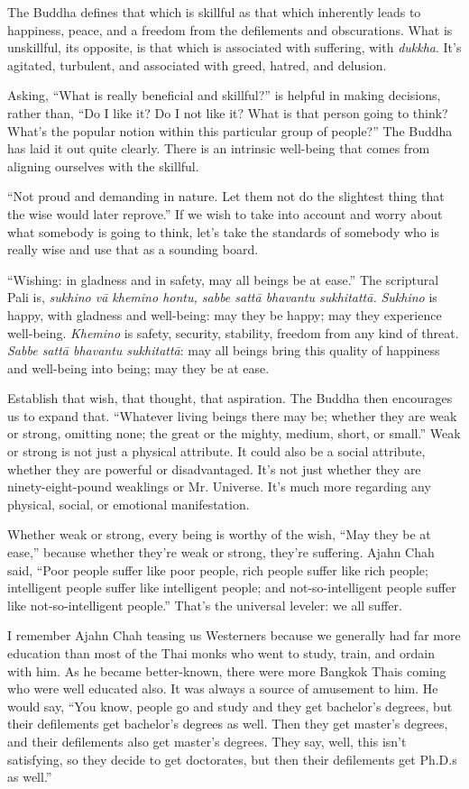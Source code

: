 The Buddha defines that which is skillful as that which inherently leads
to happiness, peace, and a freedom from the defilements and
obscurations. What is unskillful, its opposite, is that which is
associated with suffering, with \emph{dukkha}. It’s agitated, turbulent,
and associated with greed, hatred, and delusion.

Asking, “What is really beneficial and skillful?” is helpful in making
decisions, rather than, “Do I like it? Do I not like it? What is that
person going to think? What’s the popular notion within this particular
group of people?” The Buddha has laid it out quite clearly. There is an
intrinsic well-being that comes from aligning ourselves with the
skillful.

“Not proud and demanding in nature. Let them not do the slightest thing
that the wise would later reprove.” If we wish to take into account and
worry about what somebody is going to think, let’s take the standards of
somebody who is really wise and use that as a sounding board.

“Wishing: in gladness and in safety, may all beings be at ease.” The
scriptural Pali is, \emph{sukhino vā khemino hontu, sabbe sattā bhavantu
sukhitattā.} \emph{Sukhino} is happy, with gladness and well-being: may
they be happy; may they experience well-being. \emph{Khemino} is safety,
security, stability, freedom from any kind of threat. \emph{Sabbe sattā
bhavantu sukhitattā}: may all beings bring this quality of happiness and
well-being into being; may they be at ease.

Establish that wish, that thought, that aspiration. The Buddha then
encourages us to expand that. “Whatever living beings there may be;
whether they are weak or strong, omitting none; the great or the mighty,
medium, short, or small.” Weak or strong is not just a physical
attribute. It could also be a social attribute, whether they are
powerful or disadvantaged. It’s not just whether they are
ninety-eight-pound weaklings or Mr. Universe. It’s much more regarding
any physical, social, or emotional manifestation.

Whether weak or strong, every being is worthy of the wish, “May they be
at ease,” because whether they’re weak or strong, they’re suffering.
Ajahn Chah said, “Poor people suffer like poor people, rich people
suffer like rich people; intelligent people suffer like intelligent
people; and not-so-intelligent people suffer like not-so-intelligent
people.” That’s the universal leveler: we all suffer.

I remember Ajahn Chah teasing us Westerners because we generally had far
more education than most of the Thai monks who went to study, train, and
ordain with him. As he became better-known, there were more Bangkok
Thais coming who were well educated also. It was always a source of
amusement to him. He would say, “You know, people go and study and they
get bachelor’s degrees, but their defilements get bachelor’s degrees as
well. Then they get master’s degrees, and their defilements also get
master’s degrees. They say, well, this isn’t satisfying, so they decide
to get doctorates, but then their defilements get Ph.D.s as well.”

